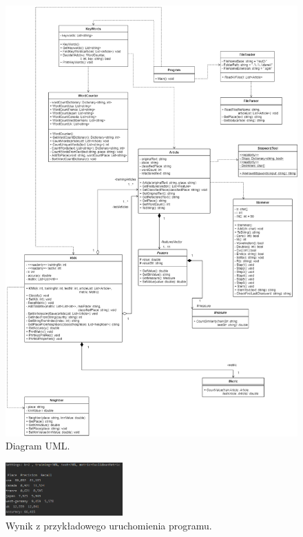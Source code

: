 \documentclass{classrep}
\begin{document}
\begin{figure}[h!]
	\centering
	\includegraphics[width=1\textwidth]{uml.png}
	\caption{Diagram UML.}
	\label{uml}
\end{figure}

\begin{figure}[h!]
	\centering
	\includegraphics[width=0.4\textwidth]{exampleRun.png}
	\caption{Wynik z przykładowego uruchomienia programu.}
	\label{exampleRun}
\end{figure}
\end{document}
